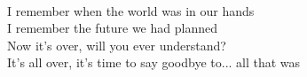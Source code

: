 \tab{}\tab{}\tab{}\\
\tab{}\tab{}\tab{}\\
\tab{}\tab{}\tab{}\\
\tab{}\tab{}\tab{}\\
\tab{}\tab{}\tab{}\\
\tab{}\tab{}\tab{}\\
I remember when the world was in our hands\\
I remember the future we had planned\\
Now it's over, will you ever understand?\\
It's all over, it's time to say goodbye to... all that was\\
\tab{}\tab{}\tab{}\\
\tab{}\tab{}\tab{}\\
\tab{}\tab{}\tab{}\\
\tab{}\tab{}\tab{}\\
\tab{}\tab{}\tab{}\\
\tab{}\tab{}\tab{}\\
\tab{}\tab{}\tab{}\\

\clearpage
{}

